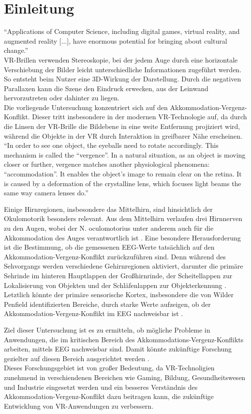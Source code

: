 \documentclass[conference]{IEEEtran}
\begin{document}
\section{Einleitung}
“Applications of Computer Science, including digital games, virtual reality, and augmented reality [...], have enormous potential for bringing about cultural change.”\cite{b2}\\
VR-Brillen verwenden Stereoskopie, bei der jedem Auge durch eine horizontale Verschiebung der Bilder leicht unterschiedliche Informationen zugeführt werden. So entsteht beim Nutzer eine 3D-Wirkung der Darstellung. Durch die negativen Parallaxen kann die Szene den Eindruck erwecken, aus der Leinwand hervorzutreten oder dahinter zu liegen.\cite{b3}\\
Die vorliegende Untersuchung konzentriert sich auf den Akkommodation-Vergenz-Konflikt. Dieser tritt insbesondere in der modernen VR-Technologie auf, da durch die Linsen der VR-Brille die Bildebene in eine weite Entfernung projiziert wird, während die Objekte in der VR durch Interaktion in greifbarer Nähe erscheinen.
“In order to see one object, the eyeballs need to rotate accordingly. This mechanism is called the “vergence”. In a natural situation, as an object is moving closer or further, vergence matches another physiological phenomena: “accommodation”. It enables the object’s image to remain clear on the retina. It is caused by a deformation of the crystalline lens, which focuses light beams the same way camera lenses do.”\cite{b4}

Einige Hirnregionen, insbesondere das Mittelhirn, sind hinsichtlich der Okulomotorik besonders relevant. Aus dem Mittelhirn verlaufen drei Hirnnerven zu den Augen, wobei der N. oculomotorius unter anderem auch für die Akkommodation des Auges verantwortlich ist \cite{b5}. Eine besondere Herausforderung ist die Bestimmung, ob die gemessenen EEG-Werte tatsächlich auf den Akkommodation-Vergenz-Konflikt zurückzuführen sind. Denn während des Sehvorgangs werden verschiedene Gehirnregionen aktiviert, darunter die primäre Sehrinde im hinteren Hauptlappen der Großhirnrinde, der Scheitellappen zur Lokalisierung von Objekten und der Schläfenlappen zur Objekterkennung \cite{b6}. Letztlich könnte der primäre sensorische Kortex, insbesondere die von Wilder Penfield identifizierten Bereiche, durch starke Werte aufzeigen, ob der Akkommodation-Vergenz-Konflikt im EEG nachweisbar ist \cite{b7}.

Ziel dieser Untersuchung ist es zu ermitteln, ob mögliche Probleme in Anwendungen, die im kritischen Bereich des Akkommodations-Vergenz-Konflikts arbeiten, mittels EEG nachweisbar sind. Damit könnte zukünftige Forschung gezielter auf diesen Bereich ausgerichtet werden \cite{b8}.\\
Dieses Forschungsgebiet ist von großer Bedeutung, da VR-Technoligien zunehmend in verschiendenen Bereichen wie Gaming, Bildung, Gesundheitswesen und Industrie eingesetzt werden und ein besseres Verständnis des Akkommodation-Vergenz-Konflikt dazu beitragen kann, die zukünftige Entwicklung von VR-Anwendungen zu verbessern.
\end{document}
